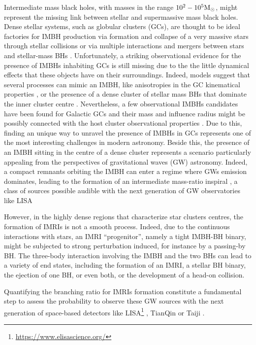 \documentclass[twocolumn]{aastex62}
\newcommand{\Ms}{{\rm M}_\odot}
\begin{document}
Intermediate mass black holes, with masses in the range $10^2-10^5\Ms$, might represent the missing link between stellar and supermassive mass black holes. Dense stellar systems, such as globular clusters (GCs), are thought to be ideal factories for IMBH production via formation and collapse of a very massive stars through stellar collisions \citep{zwart02, giersz15, mapelli16} or via multiple interactions and mergers between stars and stellar-mass BHs \citep{giersz15}. Unfortunately, a striking observational evidence for the presence of IMBHs inhabiting GCs is still missing due to the the little dynamical effects that these objects have on their surroundings. Indeed, models suggest that several processes can mimic an IMBH, like anisotropies in the GC kinematical properties \citep{zocchi}, or the presence of a dense cluster of stellar mass BHs that dominate the inner cluster centre \citep{AAG18a,AAG18b,AS16,vandermarel10}. Nevertheless, a few observational IMBHs candidates have been found for Galactic GCs \citep{noyola10,lu13,lanzoni13,kiziltan17} and their mass and influence radius might be possibly connected with the host cluster observational properties \citep{AAG18a}. Due to this, finding an unique way to unravel the presence of IMBHs in GCs represents one of the most interesting challenges in modern astronomy. Beside this, the presence of an IMBH sitting in the centre of a dense cluster represents a scenario particularly appealing from the perspectives of gravitational waves (GW) astronomy. Indeed, a compact remnants orbiting the IMBH can enter a regime where GWs emission dominates, leading to the formation of an intermediate mass-ratio inspiral \citep[IMRI,][]{konstantinidis13,haster16,leigh14}, a class of sources possible audible with the next generation of GW observatories like LISA \citep{seoane07,amaro12,seoane18}

However, in the highly dense regions that characterize star clusters centres, the formation of IMRIs is not a smooth process. Indeed, due to the continuous interactions with stars, an IMRI ``progenitor'', namely a tight IMBH-BH binary, might be subjected to strong perturbation induced, for instance by a passing-by BH. The three-body interaction involving the IMBH and the two BHs can lead to a variety of end states, including the formation of an IMRI, a stellar BH binary, the ejection of one BH, or even both, or the development of a head-on collision. 

Quantifying the branching ratio for IMRIs formation constitute a fundamental step to assess the probability to observe these GW sources with the next generation of space-based detectors like LISA\footnote{\url{https://www.elisascience.org/}} \citep{seoane07}, TianQin \citep{tianqin16} or Taiji \citep{taiji17}.
\end{document}

